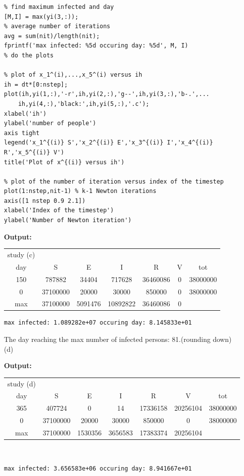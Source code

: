 \documentclass[12pt]{article}
\begin{document}
\begin{lstlisting}
% find maximum infected and day
[M,I] = max(yi(3,:)); 
% average number of iterations
avg = sum(nit)/length(nit);
fprintf('max infected: %5d occuring day: %5d', M, I)
% do the plots

% plot of x_1^(i),...,x_5^(i) versus ih
ih = dt*[0:nstep];
plot(ih,yi(1,:),'-r',ih,yi(2,:),'g--',ih,yi(3,:),'b-.',...
    ih,yi(4,:),'black:',ih,yi(5,:),'.c');
xlabel('ih')
ylabel('number of people')
axis tight
legend('x_1^{(i)} S','x_2^{(i)} E','x_3^{(i)} I','x_4^{(i)} R','x_5^{(i)} V')
title('Plot of x^{(i)} versus ih')

% plot of the number of iteration versus index of the timestep
plot(1:nstep,nit-1) % k-1 Newton iterations
axis([1 nstep 0.9 2.1])
xlabel('Index of the timestep')
ylabel('Number of Newton iteration')
\end{lstlisting}

\textbf{Output:}

\begin{tabular}{c|c c c c c c}
study (c)\\

day &  S    &      E    &      I    &      R    &      V    &    tot\\
  150  &   787882   &  34404 &    717628 & 36460086     &    0 &  38000000\\
    0  & 37100000  &   20000  &   30000  &  850000      &   0  & 38000000\\
\hline
max  &   37100000 &  5091476 & 10892822 & 36460086      &   0\\

\end{tabular}

\begin{lstlisting}
max infected: 1.089282e+07 occuring day: 8.145833e+01
\end{lstlisting}

The day reaching the max number of infected persons: 81.(rounding down)\\

(d)

\textbf{Output:}

\begin{center}
\begin{tabular}{ c c c c c c c}
study (d)\\
day &  S    &      E    &      I    &      R    &      V    &    tot\\
  365   &  407724   &      0    &    14 & 17336158 & 20256104 &  38000000\\
    0  & 37100000  &   20000    & 30000  &  850000  &   0 &  38000000\\
\hline
max   &  37100000 &  1530356 &  3656583 & 17383374 & 20256104\\
\end{tabular}
\end{center}\\
\begin{lstlisting}
max infected: 3.656583e+06 occuring day: 8.941667e+01
\end{lstlisting}
\end{document}
